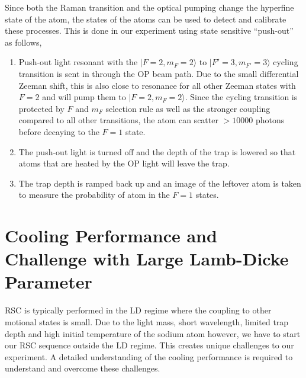 Since both the Raman transition and the optical pumping change the hyperfine state of the atom,
the states of the atoms can be used to detect and calibrate these processes.
This is done in our experiment using state sensitive ``push-out'' as follows,
\begin{enumerate}
\item Push-out light resonant with the $|F=2,m_F=2\rangle$ to
  $|F'=3,m_{F'}=3\rangle$ cycling transition is sent in through the OP beam path.
  Due to the small differential Zeeman shift, this is also close to resonance
  for all other Zeeman states with $F=2$ and will pump them to $|F=2,m_F=2\rangle$.
  Since the cycling transition is protected by $F$ and $m_F$ selection rule
  as well as the stronger coupling compared to all other transitions,
  the atom can scatter $>\!10000$ photons before decaying to the $F=1$ state.
\item The push-out light is turned off and the depth of the trap is lowered so that
  atoms that are heated by the OP light will leave the trap.
\item The trap depth is ramped back up and an image of the leftover atom
  is taken to measure the probability of atom in the $F=1$ states.
\end{enumerate}

\section{Cooling Performance and Challenge with Large Lamb-Dicke Parameter}
\label{ch:rsc:challenges}

RSC is typically performed in the LD regime where the coupling
to other motional states is small.
Due to the light mass, short wavelength, limited trap depth and high initial temperature
of the sodium atom however, we have to start our RSC sequence outside the LD regime.
This creates unique challenges to our experiment.
A detailed understanding of the cooling performance is required to understand
and overcome these challenges.

